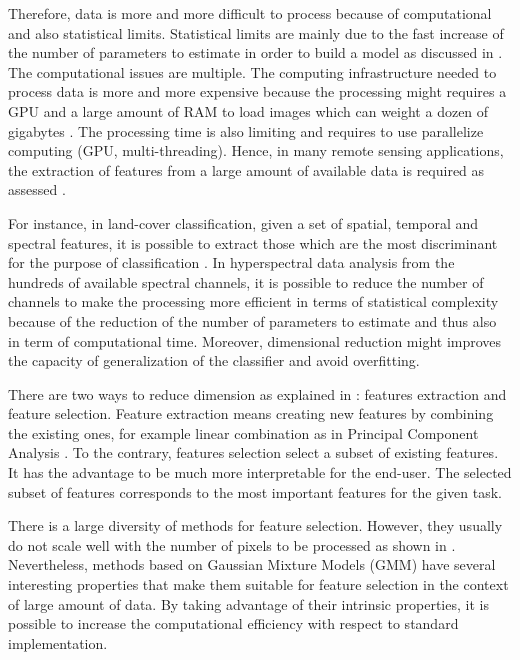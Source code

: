 \documentclass[a4paper,11pt,DIV=16,abstracton]{scrartcl}
\begin{document}
Therefore, data is more and more difficult to process because of computational and also statistical limits. Statistical limits are mainly due to the fast increase of the number of parameters to estimate in order to build a model as discussed in \cite{bouveyron2014model}. The computational issues are multiple. The computing infrastructure needed to process data is more and more expensive because the processing might requires a GPU and a large amount of RAM to load images which can weight a dozen of gigabytes \cite{christophe2011remote}\cite{plaza2011high}. The processing time is also limiting and requires to use parallelize computing (GPU, multi-threading). Hence, in many remote sensing applications, the extraction of features from a large amount of available data is required as assessed \cite{jimenez1998supervised}.

For instance, in land-cover classification, given a set of spatial, temporal and spectral features, it is possible to extract those which are the most discriminant for the purpose of classification \cite{fassnacht2014comparison}. In hyperspectral data analysis from the hundreds of available spectral channels, it is possible to reduce the number of channels to make the processing more efficient in terms of statistical complexity because of the reduction of the number of parameters to estimate and thus also in term of computational time. Moreover, dimensional reduction might improves the capacity of generalization of the classifier and avoid overfitting.

There are two ways to reduce dimension as explained in \cite{Guyon:2006:FEF:1208773}: features extraction and feature selection. Feature extraction means creating new features by combining the existing ones, for example linear combination as in Principal Component Analysis \cite{jimenez1998supervised}. To the contrary, features selection select a subset of existing features. It has the advantage to be much more interpretable for the end-user. The selected subset of features corresponds to the most important features for the given task.

There is a large diversity of methods for feature selection. However, they usually do not scale well with the number of pixels to be processed as shown in \cite{fauvel2015fast}. Nevertheless, methods based on Gaussian Mixture Models (GMM) have several interesting properties that make them suitable for feature selection in the context of large amount of data. By taking advantage of their intrinsic properties, it is possible to increase the computational efficiency with respect to standard implementation.
\end{document}
